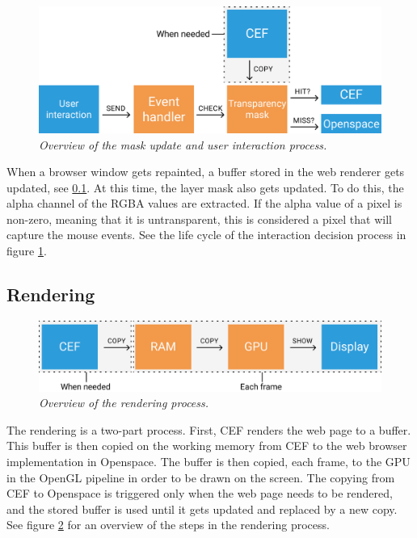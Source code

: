 \begin{figure}[!h]
\centering
\includegraphics[width=0.9\linewidth]{./figures/maskupdate.png}
\caption{\emph{Overview of the mask update and user interaction process.}}\label{fig:maskupdate}
\end{figure}

When a browser window gets repainted, a buffer stored in the web renderer gets updated, see \ref{sec:rendering}. At this time, the layer mask also gets updated. To do this, the alpha channel of the RGBA values are extracted. If the alpha value of a pixel is non-zero, meaning that it is untransparent, this is considered a pixel that will capture the mouse events. See the life cycle of the interaction decision process in figure \ref{fig:maskupdate}.

\subsection{Rendering}\label{sec:rendering}

\begin{figure}[!h]
\centering
\includegraphics[width=0.9\linewidth]{./figures/rendering.png}
\caption{\emph{Overview of the rendering process.}}\label{fig:rendering}
\end{figure}

The rendering is a two-part process. First, CEF renders the web page to a buffer. This buffer is then copied on the working memory from CEF to the web browser implementation in Openspace. The buffer is then copied, each frame, to the GPU in the OpenGL pipeline in order to be drawn on the screen. The copying from CEF to Openspace is triggered only when the web page needs to be rendered, and the stored buffer is used until it gets updated and replaced by a new copy. See figure \ref{fig:rendering} for an overview of the steps in the rendering process.

